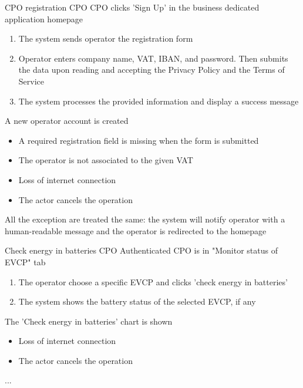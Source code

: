 \usecase
{CPO registration} %
{CPO} %
{CPO clicks 'Sign Up' in the business dedicated application homepage} %
{ %
    \begin{enumerate}
        \item The system sends operator the registration form
        \item Operator enters company name, VAT, IBAN, and password. Then submits the data upon reading and accepting the Privacy Policy and the Terms of Service
        \item The system processes the provided information and display a success message
    \end{enumerate}
}
{A new operator account is created} %
{ %
    \begin{itemize}
        \item A required registration field is missing when the form is submitted
        \item The operator is not associated to the given VAT
        \item Loss of internet connection
        \item The actor cancels the operation

    \end{itemize}
}
{ %
    All the exception are treated the same: the system will notify operator with a human-readable message and the operator is redirected to the homepage
}

\usecase
{Check energy in batteries} %
{CPO} %
{Authenticated CPO is in "Monitor status of EVCP" tab} %
{ %
    \begin{enumerate}
        \item The operator choose a specific EVCP and clicks 'check energy in batteries'
        \item The system shows the battery status of the selected EVCP, if any
    \end{enumerate}
}
{The 'Check energy in batteries' chart is shown} %
{ %
    \begin{itemize}
        \item Loss of internet connection
        \item The actor cancels the operation
    \end{itemize}
}
{ %
    ...
}

